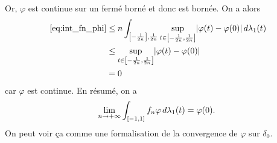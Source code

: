 {\begin{nntd-sol}[]
\begin{enumerate}
            Or, \(\varphi\) est continue sur un fermé borné et donc est bornée. On a alors
            \begin{equation*}
                \begin{aligned}
                    ~\eqref{eq:int_fn_phi} 
                    &\leq n\int_{\mathopen{}\left[-\frac{1}{2n}\right]\mathclose{},\frac{1}{2n}} \sup_{t\in\mathopen{}\left[-\frac{1}{2n},\frac{1}{2n}\right]\mathclose{}}\mathopen{}\left|\varphi(t) - \varphi(0)\right|\mathclose{}\mathop{}\!{d}\lambda_1(t) \\
                    &\leq \sup_{t\in\mathopen{}\left[-\frac{1}{2n},\frac{1}{2n}\right]\mathclose{}}\mathopen{}\left|\varphi(t) - \varphi(0)\right|\mathclose{}\\
                    &= 0
                \end{aligned}
            \end{equation*}
            car \(\varphi\) est continue. En résumé, on a
            \begin{equation*}
                \lim_{n\to+\infty}\int_{\mathopen{}\left[-1,1\right]\mathclose{}}f_n\varphi\mathop{}\!{d}\lambda_1(t) = \varphi(0).
            \end{equation*}
            On peut voir ça comme une formalisation de la convergence de \(\varphi\) sur \(\delta_0\).
            
        \end{enumerate}
    \end{nntd-sol}
}{}

